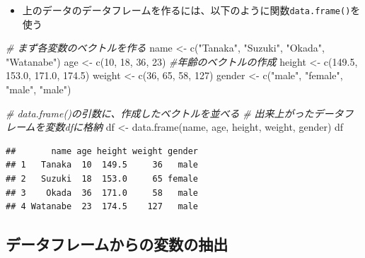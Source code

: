 \documentclass[
]{book}
\newenvironment{Shaded}{\begin{snugshade}}{\end{snugshade}}
\newcommand{\CommentTok}[1]{\textcolor[rgb]{0.56,0.35,0.01}{\textit{#1}}}
\newcommand{\DecValTok}[1]{\textcolor[rgb]{0.00,0.00,0.81}{#1}}
\newcommand{\FloatTok}[1]{\textcolor[rgb]{0.00,0.00,0.81}{#1}}
\newcommand{\FunctionTok}[1]{\textcolor[rgb]{0.00,0.00,0.00}{#1}}
\newcommand{\NormalTok}[1]{#1}
\newcommand{\OtherTok}[1]{\textcolor[rgb]{0.56,0.35,0.01}{#1}}
\newcommand{\StringTok}[1]{\textcolor[rgb]{0.31,0.60,0.02}{#1}}
\providecommand{\tightlist}{%
  \setlength{\itemsep}{0pt}\setlength{\parskip}{0pt}}
\begin{document}
\begin{itemize}
\tightlist
\item
  上のデータのデータフレームを作るには、以下のように関数\texttt{data.frame()}を使う
\end{itemize}

\begin{Shaded}
\begin{Highlighting}[]
\CommentTok{\# まず各変数のベクトルを作る}
\NormalTok{name }\OtherTok{\textless{}{-}} \FunctionTok{c}\NormalTok{(}\StringTok{"Tanaka"}\NormalTok{, }\StringTok{"Suzuki"}\NormalTok{, }\StringTok{"Okada"}\NormalTok{, }\StringTok{"Watanabe"}\NormalTok{)}
\NormalTok{age }\OtherTok{\textless{}{-}} \FunctionTok{c}\NormalTok{(}\DecValTok{10}\NormalTok{, }\DecValTok{18}\NormalTok{, }\DecValTok{36}\NormalTok{, }\DecValTok{23}\NormalTok{) }\CommentTok{\#年齢のベクトルの作成}
\NormalTok{height }\OtherTok{\textless{}{-}} \FunctionTok{c}\NormalTok{(}\FloatTok{149.5}\NormalTok{, }\FloatTok{153.0}\NormalTok{, }\FloatTok{171.0}\NormalTok{, }\FloatTok{174.5}\NormalTok{)}
\NormalTok{weight }\OtherTok{\textless{}{-}} \FunctionTok{c}\NormalTok{(}\DecValTok{36}\NormalTok{, }\DecValTok{65}\NormalTok{, }\DecValTok{58}\NormalTok{, }\DecValTok{127}\NormalTok{)}
\NormalTok{gender }\OtherTok{\textless{}{-}} \FunctionTok{c}\NormalTok{(}\StringTok{"male"}\NormalTok{, }\StringTok{"female"}\NormalTok{, }\StringTok{"male"}\NormalTok{, }\StringTok{"male"}\NormalTok{) }

\CommentTok{\# data.frame()の引数に、作成したベクトルを並べる}
\CommentTok{\# 出来上がったデータフレームを変数dfに格納}
\NormalTok{df }\OtherTok{\textless{}{-}} \FunctionTok{data.frame}\NormalTok{(name, age, height, weight, gender)}
\NormalTok{df}
\end{Highlighting}
\end{Shaded}

\begin{verbatim}
##       name age height weight gender
## 1   Tanaka  10  149.5     36   male
## 2   Suzuki  18  153.0     65 female
## 3    Okada  36  171.0     58   male
## 4 Watanabe  23  174.5    127   male
\end{verbatim}

\hypertarget{ux30c7ux30fcux30bfux30d5ux30ecux30fcux30e0ux304bux3089ux306eux5909ux6570ux306eux62bdux51fa}{%
\subsection{データフレームからの変数の抽出}\label{ux30c7ux30fcux30bfux30d5ux30ecux30fcux30e0ux304bux3089ux306eux5909ux6570ux306eux62bdux51fa}}
\end{document}
